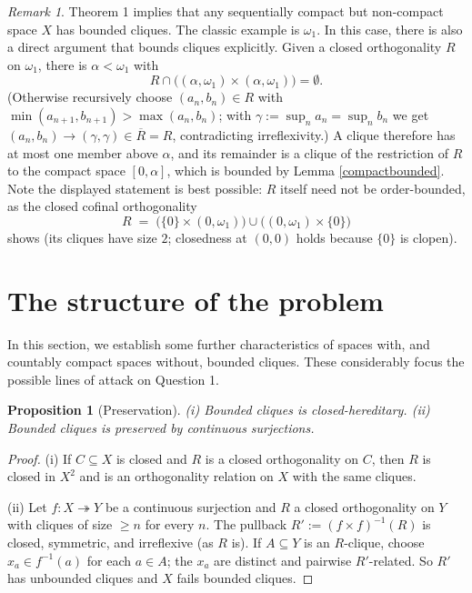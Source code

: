 \documentclass[12pt]{article}
\theoremstyle{plain}
\newtheorem{proposition}{Proposition}
\theoremstyle{definition}
\theoremstyle{remark}
\newtheorem{remark}{Remark}
\begin{document}
\begin{remark}\label{omegaone}
Theorem 1 implies that any sequentially compact but 
non-compact space $X$ has bounded cliques. The 
classic example is $\omega_1$. 
In this case, there is also a direct argument 
that bounds cliques explicitly. Given a closed orthogonality $R$ on $\omega_1$, there is $\alpha < \omega_1$ with
\[ R \cap \big( (\alpha, \omega_1) \times (\alpha, \omega_1) \big) = \emptyset. \]
(Otherwise recursively choose $(a_n, b_n) \in R$ with $\min(a_{n+1}, b_{n+1}) > \max(a_n, b_n)$; with $\gamma := \sup_n a_n = \sup_n b_n$ we get $(a_n,b_n) \to (\gamma,\gamma) \in \overline{R} = R$, contradicting irreflexivity.) A clique therefore has at most one member above $\alpha$, and its remainder is a clique of the restriction of $R$ to the compact space $[0,\alpha]$, which is bounded by Lemma \ref{compactbounded}. Note the displayed statement is best possible: $R$ itself need not be order-bounded, as the closed cofinal orthogonality
\[ R \;=\; \big( \{0\} \times (0,\omega_1) \big) \cup \big( (0,\omega_1) \times \{0\} \big) \]
shows (its cliques have size $2$; closedness at $(0,0)$ holds because $\{0\}$ is clopen).
\end{remark}


\section{The structure of the problem}

In this section, we establish some further 
characteristics of spaces with, and countably compact 
spaces without, bounded cliques. These considerably focus the possible lines of attack on Question 1. 


\begin{proposition}[Preservation]\label{preserve}
(i) Bounded cliques is closed-hereditary. (ii) Bounded cliques is preserved by continuous surjections.
\end{proposition}

\begin{proof}
(i) If $C \subseteq X$ is closed and $R$ is a closed orthogonality on $C$, then $R$ is closed in $X^2$ and is an orthogonality relation on $X$ with the same cliques.

(ii) Let $f : X \twoheadrightarrow Y$ be a continuous surjection and $R$ a closed orthogonality on $Y$ with cliques of size $\geq n$ for every $n$. The pullback $R' := (f \times f)^{-1}(R)$ is closed, symmetric, and irreflexive (as $R$ is). If $A \subseteq Y$ is an $R$-clique, choose $x_a \in f^{-1}(a)$ for each $a \in A$; the $x_a$ are distinct and pairwise $R'$-related. So $R'$ has unbounded cliques and $X$ fails bounded cliques.
\end{proof}
\end{document}
